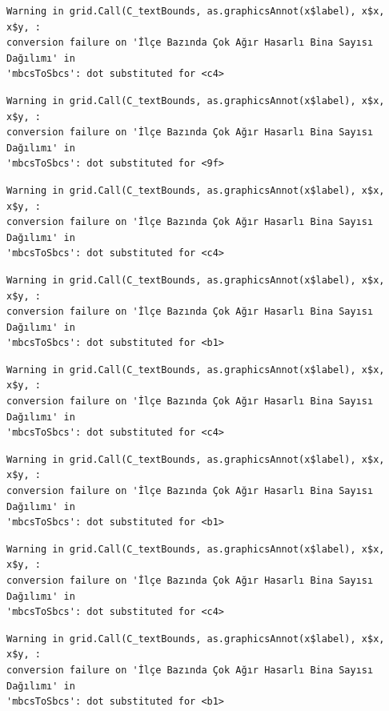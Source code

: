 \documentclass[
  11pt,
  a4paper,
  DIV=11,
  numbers=noendperiod]{scrartcl}
\begin{document}
\begin{verbatim}
Warning in grid.Call(C_textBounds, as.graphicsAnnot(x$label), x$x, x$y, :
conversion failure on 'İlçe Bazında Çok Ağır Hasarlı Bina Sayısı Dağılımı' in
'mbcsToSbcs': dot substituted for <c4>
\end{verbatim}

\begin{verbatim}
Warning in grid.Call(C_textBounds, as.graphicsAnnot(x$label), x$x, x$y, :
conversion failure on 'İlçe Bazında Çok Ağır Hasarlı Bina Sayısı Dağılımı' in
'mbcsToSbcs': dot substituted for <9f>
\end{verbatim}

\begin{verbatim}
Warning in grid.Call(C_textBounds, as.graphicsAnnot(x$label), x$x, x$y, :
conversion failure on 'İlçe Bazında Çok Ağır Hasarlı Bina Sayısı Dağılımı' in
'mbcsToSbcs': dot substituted for <c4>
\end{verbatim}

\begin{verbatim}
Warning in grid.Call(C_textBounds, as.graphicsAnnot(x$label), x$x, x$y, :
conversion failure on 'İlçe Bazında Çok Ağır Hasarlı Bina Sayısı Dağılımı' in
'mbcsToSbcs': dot substituted for <b1>
\end{verbatim}

\begin{verbatim}
Warning in grid.Call(C_textBounds, as.graphicsAnnot(x$label), x$x, x$y, :
conversion failure on 'İlçe Bazında Çok Ağır Hasarlı Bina Sayısı Dağılımı' in
'mbcsToSbcs': dot substituted for <c4>
\end{verbatim}

\begin{verbatim}
Warning in grid.Call(C_textBounds, as.graphicsAnnot(x$label), x$x, x$y, :
conversion failure on 'İlçe Bazında Çok Ağır Hasarlı Bina Sayısı Dağılımı' in
'mbcsToSbcs': dot substituted for <b1>
\end{verbatim}

\begin{verbatim}
Warning in grid.Call(C_textBounds, as.graphicsAnnot(x$label), x$x, x$y, :
conversion failure on 'İlçe Bazında Çok Ağır Hasarlı Bina Sayısı Dağılımı' in
'mbcsToSbcs': dot substituted for <c4>
\end{verbatim}

\begin{verbatim}
Warning in grid.Call(C_textBounds, as.graphicsAnnot(x$label), x$x, x$y, :
conversion failure on 'İlçe Bazında Çok Ağır Hasarlı Bina Sayısı Dağılımı' in
'mbcsToSbcs': dot substituted for <b1>
\end{verbatim}
\end{document}
